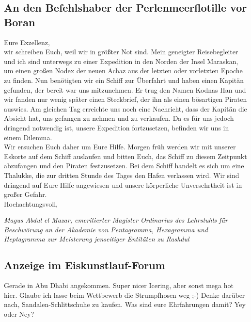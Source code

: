 \documentclass[final]{multiversum}
\begin{document}
\subsection{An den Befehlshaber der Perlenmeerflotille vor Boran}
Eure Exzellenz,\\[1em]
wir schreiben Euch, weil wir in größter Not sind.
Mein geneigter Reisebegleiter und ich sind unterwegs zu einer Expedition in den Norden der Insel Maraskan, um einen großen Nodex der neuen Achaz aus der letzten oder vorletzten Epoche zu finden.
Nun benötigten wir ein Schiff zur Überfahrt und haben einen Kapitän gefunden, der bereit war uns mitzunehmen.
Er trug den Namen Kodnas Han und wir fanden nur wenig später einen Steckbrief, der ihn als einen bösartigen Piraten auswies.
Am gleichen Tag erreichte uns noch eine Nachricht, dass der Kapitän die Absicht hat, uns gefangen zu nehmen und zu verkaufen.
Da es für uns jedoch dringend notwendig ist, unsere Expedition fortzusetzen, befinden wir uns in einem Dilemma.\\
Wir ersuchen Euch daher um Eure Hilfe.
Morgen früh werden wir mit unserer Eskorte auf dem Schiff auslaufen und bitten Euch, das Schiff zu diesem Zeitpunkt abzufangen und den Piraten festzusetzen.
Bei dem Schiff handelt es sich um eine Thalukke, die zur dritten Stunde des Tages den Hafen verlassen wird.
Wir sind dringend auf Eure Hilfe angewiesen und unsere körperliche Unversehrtheit ist in großer Gefahr.\\[1em]
Hochachtungsvoll,
\begin{flushright}
    \textit{Magus Abdul el Mazar, emeritierter Magister Ordinarius des Lehrstuhls für Beschwörung an der Akademie von Pentagramma, Hexagramma und Heptagramma zur Meisterung jenseitiger Entitäten zu Rashdul}
\end{flushright}

\subsection{Anzeige im Eiskunstlauf-Forum}
Gerade in Abu Dhabi angekommen. 
Super nicer Icering, aber sonst mega hot hier.
Glaube ich lasse beim Wettbewerb die Strumpfhosen weg ;-)
Denke darüber nach, Sandalen-Schlittschuhe zu kaufen.
Was sind eure Ehrfahrungen damit?
Yey oder Ney?
\end{document}

